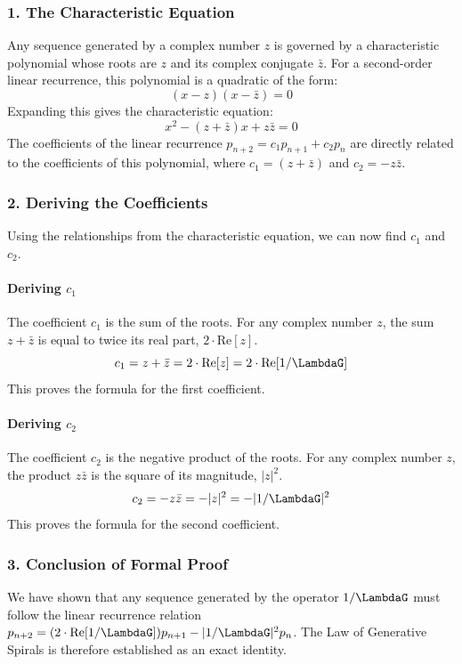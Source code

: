 \subsubsection{1. The Characteristic Equation}
Any sequence generated by a complex number $z$ is governed by a characteristic polynomial whose roots are $z$ and its complex conjugate $\bar{z}$. For a second-order linear recurrence, this polynomial is a quadratic of the form:
$$ (x - z)(x - \bar{z}) = 0 $$
Expanding this gives the characteristic equation:
$$ x^2 - (z + \bar{z})x + z\bar{z} = 0 $$
The coefficients of the linear recurrence $p_{n+2} = c_1 p_{n+1} + c_2 p_n$ are directly related to the coefficients of this polynomial, where $c_1 = (z+\bar{z})$ and $c_2 = -z\bar{z}$.

\subsubsection{2. Deriving the Coefficients}
Using the relationships from the characteristic equation, we can now find $c_1$ and $c_2$.

\paragraph{Deriving $c_1$}
The coefficient $c_1$ is the sum of the roots. For any complex number $z$, the sum $z+\bar{z}$ is equal to twice its real part, $2 \cdot \text{Re}[z]$.
$$ c_1 = z + \bar{z} = 2 \cdot \text{Re}[z] = 2 \cdot \text{Re}[1/\LambdaG] $$
This proves the formula for the first coefficient.

\paragraph{Deriving $c_2$}
The coefficient $c_2$ is the negative product of the roots. For any complex number $z$, the product $z\bar{z}$ is the square of its magnitude, $|z|^2$.
$$ c_2 = -z\bar{z} = -|z|^2 = -|1/\LambdaG|^2 $$
This proves the formula for the second coefficient.

\subsubsection{3. Conclusion of Formal Proof}
We have shown that any sequence generated by the operator $1/\LambdaG$ must follow the linear recurrence relation $p_{n+2} = (2 \cdot \text{Re}[1/\LambdaG]) p_{n+1} - |1/\LambdaG|^2 p_n$. The Law of Generative Spirals is therefore established as an exact identity.

